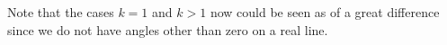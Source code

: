   \begin{remark}
    Note that the cases $k=1$ and $k > 1$ now could be seen as of a great difference since we do not have angles other than zero on a real line.
  \end{remark}
